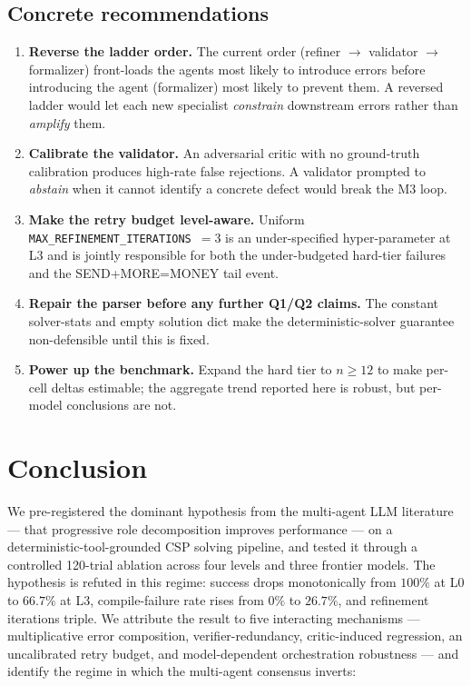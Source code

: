\documentclass[11pt,a4paper]{article}
\begin{document}
\subsection{Concrete recommendations}
\begin{enumerate}[leftmargin=1.2cm,itemsep=1pt,topsep=2pt]
\item \textbf{Reverse the ladder order.} The current order
(refiner $\to$ validator $\to$ formalizer) front-loads the agents most
likely to introduce errors before introducing the agent (formalizer) most
likely to prevent them. A reversed ladder would let each new specialist
\emph{constrain} downstream errors rather than \emph{amplify} them.
\item \textbf{Calibrate the validator.} An adversarial critic with no
ground-truth calibration produces high-rate false rejections. A validator
prompted to \emph{abstain} when it cannot identify a concrete defect would
break the M3 loop.
\item \textbf{Make the retry budget level-aware.} Uniform
\texttt{MAX\_REFINEMENT\_ITERATIONS}~$=3$ is an under-specified
hyper-parameter at L3 and is jointly responsible for both the under-budgeted
hard-tier failures and the SEND+MORE=MONEY tail event.
\item \textbf{Repair the parser before any further Q1/Q2 claims.} The
constant solver-stats and empty solution dict make the deterministic-solver
guarantee non-defensible until this is fixed.
\item \textbf{Power up the benchmark.} Expand the hard tier to $n \geq 12$
to make per-cell deltas estimable; the aggregate trend reported here is
robust, but per-model conclusions are not.
\end{enumerate}

\section{Conclusion}

We pre-registered the dominant hypothesis from the multi-agent LLM
literature --- that progressive role decomposition improves performance ---
on a deterministic-tool-grounded CSP solving pipeline, and tested it
through a controlled 120-trial ablation across four levels and three
frontier models. The hypothesis is refuted in this regime: success drops
monotonically from $100\%$ at L0 to $66.7\%$ at L3, compile-failure rate
rises from $0\%$ to $26.7\%$, and refinement iterations triple. We attribute
the result to five interacting mechanisms --- multiplicative error
composition, verifier-redundancy, critic-induced regression, an
uncalibrated retry budget, and model-dependent orchestration robustness ---
and identify the regime in which the multi-agent consensus inverts:
\end{document}
